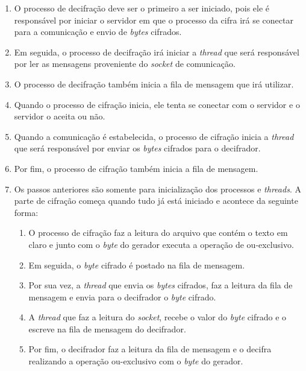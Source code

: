 \begin{enumerate}
	\item O processo de decifração deve ser o primeiro a ser iniciado, pois ele é responsável por iniciar o servidor em que o processo da cifra irá se conectar para a comunicação e envio de \textit{bytes} cifrados.
	\item Em seguida, o processo de decifração irá iniciar a \textit{thread} que será responsável por ler as mensagens proveniente do \textit{socket} de comunicação.
	\item O processo de decifração também inicia a fila de mensagem que irá utilizar.
	\item Quando o processo de cifração inicia, ele tenta se conectar com o servidor e o servidor o aceita ou não.
	\item Quando a comunicação é estabelecida, o processo de cifração inicia a \textit{thread} que será responsável por enviar os \textit{bytes} cifrados para o decifrador.
	\item Por fim, o processo de cifração também inicia a fila de mensagem.
	\item Os passos anteriores são somente para inicialização dos processos e \textit{threads}. A parte de cifração começa quando tudo já está iniciado e acontece da seguinte forma:
		\begin{enumerate}
			\item O processo de cifração faz a leitura do arquivo que contém o texto em claro e junto com o \textit{byte} do gerador executa a operação de ou-exclusivo.
			\item Em seguida, o \textit{byte} cifrado é postado na fila de mensagem.
			\item Por sua vez, a \textit{thread} que envia os \textit{bytes} cifrados, faz a leitura da fila de mensagem e envia para o decifrador o \textit{byte} cifrado.
			\item A \textit{thread} que faz a leitura do \textit{socket}, recebe o valor do \textit{byte} cifrado e o escreve na fila de mensagem do decifrador.
			\item Por fim, o decifrador faz a leitura da fila de mensagem e o decifra realizando a operação ou-exclusivo com o \textit{byte} do gerador.
		\end{enumerate}

\end{enumerate}
